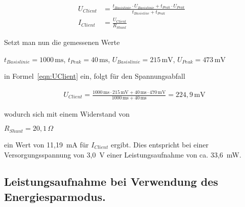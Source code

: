 \begin{align}
    U_{Client} &= \frac{t_{Basislinie} \cdot U_{Basislinie} + t_{Peak} \cdot U_{Peak}}{t_{Basisline} + t_{Peak}}
   \label{eqn:UClient}\\
    I_{Client} &= \frac{U_{Client}}{R_{Shunt}}
    \label{eqn:IClient}
\end{align}

Setzt man nun die gemessenen Werte 

\begin{center}
    $t_{Basislinie} = 1000\,\text{ms}$,\quad
    $t_{Peak}       = 40\,\text{ms}$,\quad
    $U_{Basislinie} = 215\,\text{mV}$,\quad
    $U_{Peak}       = 473\,\text{mV}$
\end{center}

in Formel~\ref{eqn:UClient} ein, folgt für den Spannungsabfall

\begin{align*}
    &U_{Client} = \frac{1000\,\text{ms} \cdot 215\,\text{mV} + 40\,\text{ms} \cdot 470\,\text{mV}}{1000\,\text{ms} + 40\,\text{ms}} = 224,9\,\text{mV}
\end{align*}

wodurch sich mit einem Widerstand von 

\begin{center}$
    R_{Shunt} = 20,1\,\Omega
    $
\end{center}

ein Wert von 11,19~mA für $I_{Client}$ ergibt. Dies entspricht bei einer Versorgungsspannung von 3,0~V einer Leistungsaufnahme
von ca. 33,6~mW.

\subsection{Leistungsaufnahme bei Verwendung des Energiesparmodus.}

\Abbildungps{!htb}{0.75}{oszi/powersave_periodic.jpg}{oszi_powersave_periodic}{Client, der das periodische Aufrufen
    des Energiesparmodus nutzt.
}

